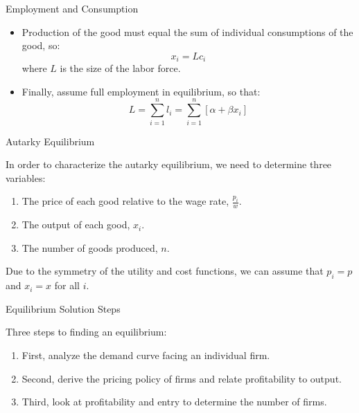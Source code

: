 \documentclass[aspectratio=169]{beamer}
\begin{document}

\begin{frame}{Employment and Consumption}

\begin{itemize}
    \item<1-> Production of the good must equal the sum of individual consumptions of the good, so:
    \begin{equation}
        x_{i} = L c_{i}
        \label{eq:consumptionproduction}
    \end{equation}
    where $ L $ is the size of the labor force.
    \item<2-> Finally, assume full employment in equilibrium, so that:
    \begin{equation*}
        L = \sum_{i = 1}^{n}l_{i} = \sum_{i = 1}^{n}\left[ \alpha + \beta x_{i} \right]
    \end{equation*}
\end{itemize}
    
\end{frame}


\begin{frame}{Autarky Equilibrium}

In order to characterize the autarky equilibrium, we need to determine three variables:

\begin{enumerate}
    \item The price of each good relative to the wage rate, $ \frac{p_{i}}{w}$.
    \item The output of each good, $ x_{i} $.
    \item The number of goods produced, $ n $.
\end{enumerate}

Due to the symmetry of the utility and cost functions, we can assume that $ p_{i} = p $ and $ x_{i} = x $ for all $ i $.
    
\end{frame}


\begin{frame}{Equilibrium Solution Steps}

Three steps to finding an equilibrium:

\begin{enumerate}
    \item<1-> First, analyze the demand curve facing an individual firm.
    \item<2-> Second, derive the pricing policy of firms and relate profitability to output.
    \item<3-> Third, look at profitability and entry to determine the number of firms.  
\end{enumerate}
    
\end{frame}
\end{document}

